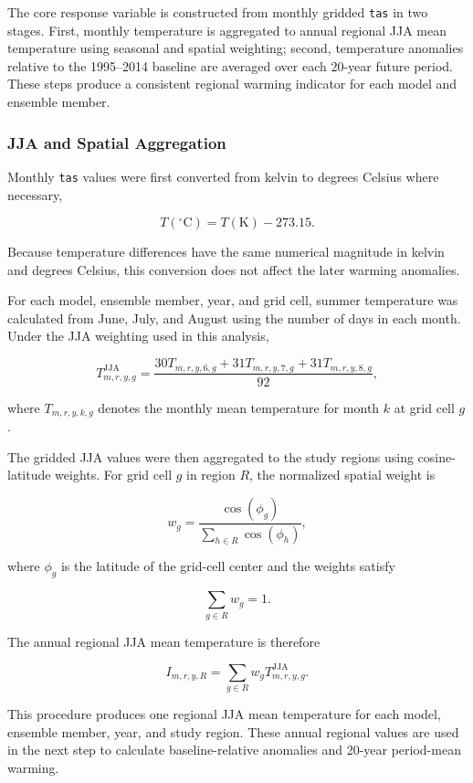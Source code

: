 \documentclass[
]{krantz}
\begin{document}
The core response variable is constructed from monthly gridded \texttt{tas} in two stages. First, monthly temperature is aggregated to annual regional JJA mean temperature using seasonal and spatial weighting; second, temperature anomalies relative to the 1995--2014 baseline are averaged over each 20-year future period. These steps produce a consistent regional warming indicator for each model and ensemble member.

\subsubsection{JJA and Spatial Aggregation}\label{jja-and-spatial-aggregation}

Monthly \texttt{tas} values were first converted from kelvin to degrees Celsius where necessary,

\[
T(^\circ\mathrm{C})
=
T(\mathrm{K})-273.15.
\]

Because temperature differences have the same numerical magnitude in kelvin and degrees Celsius, this conversion does not affect the later warming anomalies.

For each model, ensemble member, year, and grid cell, summer temperature was calculated from June, July, and August using the number of days in each month. Under the JJA weighting used in this analysis,

\[
T^{\mathrm{JJA}}_{m,r,y,g}
=
\frac{
30T_{m,r,y,6,g}
+
31T_{m,r,y,7,g}
+
31T_{m,r,y,8,g}
}{92},
\]

where \(T_{m,r,y,k,g}\) denotes the monthly mean temperature for month \(k\) at grid cell \(g\).

The gridded JJA values were then aggregated to the study regions using cosine-latitude weights. For grid cell \(g\) in region \(R\), the normalized spatial weight is

\[
w_g
=
\frac{\cos(\phi_g)}
{\sum_{h\in R}\cos(\phi_h)},
\]

where \(\phi_g\) is the latitude of the grid-cell center and the weights satisfy

\[
\sum_{g\in R} w_g = 1.
\]

The annual regional JJA mean temperature is therefore

\[
I_{m,r,y,R}
=
\sum_{g\in R}
w_g T^{\mathrm{JJA}}_{m,r,y,g}.
\]

This procedure produces one regional JJA mean temperature for each model, ensemble member, year, and study region. These annual regional values are used in the next step to calculate baseline-relative anomalies and 20-year period-mean warming.
\end{document}
